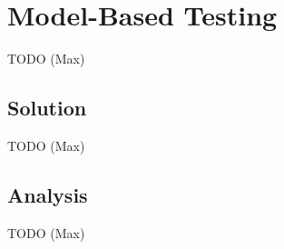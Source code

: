 \documentclass{vldb}
\begin{document}








\section{Model-Based Testing}
\label{sec:model_based_testing}
TODO (Max)
\subsection{Solution}
\label{subsec:mbt_solution}
TODO (Max)
\subsection{Analysis}
\label{subsec:mbt_analysis}
TODO (Max)

\end{document}
